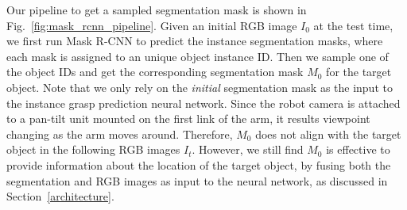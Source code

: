 \documentclass[letterpaper, 10 pt, conference]{ieeeconf}  %
\begin{document}
Our pipeline to get a sampled segmentation mask is shown in Fig.~\ref{fig:mask_rcnn_pipeline}. Given an initial RGB image $I_0$ at the test time, we first run Mask R-CNN\cite{he2017mask} to predict the instance segmentation masks, where each mask is assigned to an unique object instance ID. Then we sample one of the object IDs and get the corresponding segmentation mask $M_0$ for the target object. Note that we only rely on the \textit{initial} segmentation mask as the input to the instance grasp prediction neural network. Since the robot camera is attached to a pan-tilt unit mounted on the first link of the arm, it results viewpoint changing as the arm moves around. Therefore, $M_0$ does not align with the target object in the following RGB images $I_t$. However, we still find $M_0$ is effective to provide information about the location of the target object, by fusing both the segmentation and RGB images as input to the neural network, as discussed in Section~\ref{architecture}.
\end{document}
